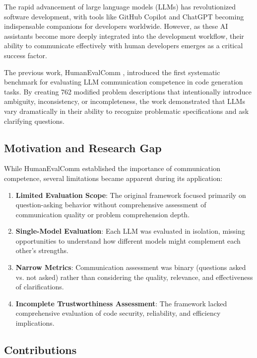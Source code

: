 \documentclass[conference]{IEEEtran}
\begin{document}
The rapid advancement of large language models (LLMs) has revolutionized software development, with tools like GitHub Copilot and ChatGPT becoming indispensable companions for developers worldwide. However, as these AI assistants become more deeply integrated into the development workflow, their ability to communicate effectively with human developers emerges as a critical success factor.

The previous work, HumanEvalComm \cite{wu2025humanevalcomm}, introduced the first systematic benchmark for evaluating LLM communication competence in code generation tasks. By creating 762 modified problem descriptions that intentionally introduce ambiguity, inconsistency, or incompleteness, the work demonstrated that LLMs vary dramatically in their ability to recognize problematic specifications and ask clarifying questions.

\subsection{Motivation and Research Gap}

While HumanEvalComm established the importance of communication competence, several limitations became apparent during its application:

\begin{enumerate}
    \item \textbf{Limited Evaluation Scope}: The original framework focused primarily on question-asking behavior without comprehensive assessment of communication quality or problem comprehension depth.
    \item \textbf{Single-Model Evaluation}: Each LLM was evaluated in isolation, missing opportunities to understand how different models might complement each other's strengths.
    \item \textbf{Narrow Metrics}: Communication assessment was binary (questions asked vs. not asked) rather than considering the quality, relevance, and effectiveness of clarifications.
    \item \textbf{Incomplete Trustworthiness Assessment}: The framework lacked comprehensive evaluation of code security, reliability, and efficiency implications.
\end{enumerate}

\subsection{Contributions}
\end{document}
